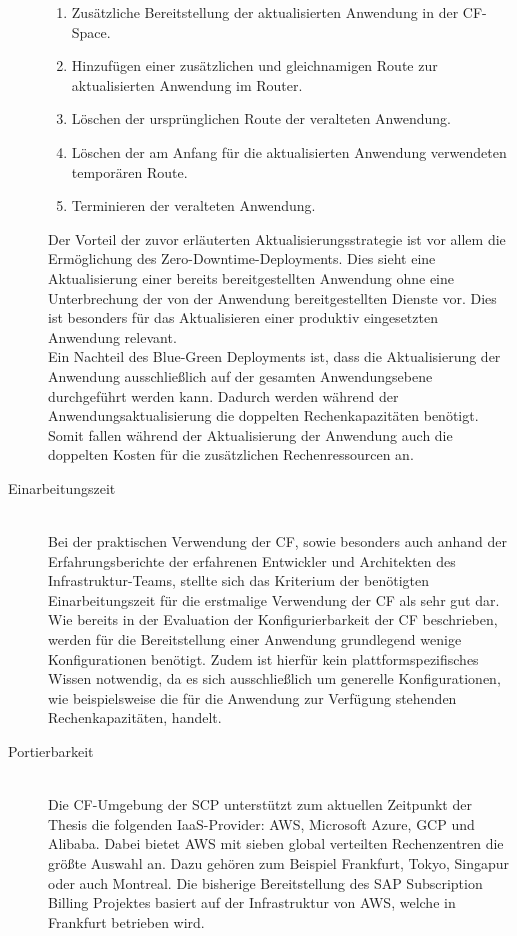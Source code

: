 \begin{description}
	\begin{enumerate}
		\item Zusätzliche Bereitstellung der aktualisierten Anwendung in der \ac{CF}-Space.
		\item Hinzufügen einer zusätzlichen und gleichnamigen Route zur aktualisierten Anwendung im Router.
		\item Löschen der ursprünglichen Route der veralteten Anwendung.
		\item Löschen der am Anfang für die aktualisierten Anwendung verwendeten temporären Route.
		\item Terminieren der veralteten Anwendung.
	\end{enumerate}
	Der Vorteil der zuvor erläuterten Aktualisierungsstrategie ist vor allem die Ermöglichung des Zero-Downtime-Deployments. Dies sieht eine Aktualisierung einer bereits bereitgestellten Anwendung ohne eine Unterbrechung der von der Anwendung bereitgestellten Dienste vor. Dies ist besonders für das Aktualisieren einer produktiv eingesetzten Anwendung relevant.\autocite[Vgl.][Blue-Green Deployment with Cloud Foundry Example]{CloudFoundryFoundation.20190422}
	\\	
	Ein Nachteil des Blue-Green Deployments ist, dass die Aktualisierung der Anwendung ausschließlich auf der gesamten Anwendungsebene durchgeführt werden kann. Dadurch werden während der Anwendungsaktualisierung die doppelten Rechenkapazitäten benötigt. Somit fallen während der Aktualisierung der Anwendung auch die doppelten Kosten für die zusätzlichen Rechenressourcen an.
	\item[Einarbeitungszeit] \hfill \\
	Bei der praktischen Verwendung der \ac{CF}, sowie besonders auch anhand der Erfahrungsberichte der erfahrenen Entwickler und Architekten des Infrastruktur-Teams, stellte sich das Kriterium der benötigten Einarbeitungszeit für die erstmalige Verwendung der \ac{CF} als sehr gut dar. Wie bereits in der Evaluation der Konfigurierbarkeit der \ac{CF} beschrieben, werden für die Bereitstellung einer Anwendung grundlegend wenige Konfigurationen benötigt. Zudem ist hierfür kein plattformspezifisches Wissen notwendig, da es sich ausschließlich um generelle Konfigurationen, wie beispielsweise die für die Anwendung zur Verfügung stehenden Rechenkapazitäten, handelt.
	\\
	\item[Portierbarkeit] \hfill \\
	Die \ac{CF}-Umgebung der \ac{SCP} unterstützt zum aktuellen Zeitpunkt der Thesis die folgenden \ac{IaaS}-Provider: \ac{AWS}, Microsoft Azure, \ac{GCP} und Alibaba. Dabei bietet \ac{AWS} mit sieben global verteilten Rechenzentren die größte Auswahl an. Dazu gehören zum Beispiel Frankfurt, Tokyo, Singapur oder auch Montreal. Die bisherige Bereitstellung des SAP Subscription Billing Projektes basiert auf der Infrastruktur von \ac{AWS}, welche in Frankfurt betrieben wird.\\

\end{description}
